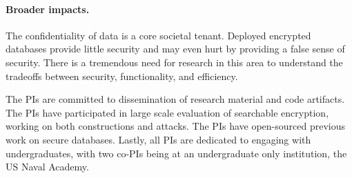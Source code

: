 \documentclass[11pt]{article}
\begin{document}
\paragraph{Broader impacts.}
The confidentiality of data is a core societal tenant.  Deployed encrypted
databases provide little security and may even hurt by providing a false sense
of security.  There is a tremendous need for research in this area to
understand the tradeoffs between security, functionality, and efficiency.

The PIs are committed to dissemination of research material and code artifacts.  The PIs
have participated in large scale evaluation of searchable encryption, working
on both constructions and attacks.  The PIs have open-sourced
previous work on secure databases.  Lastly, all PIs are
dedicated to engaging with undergraduates, with two co-PIs being at an
undergraduate only institution, the US Naval Academy.  
\end{document}
